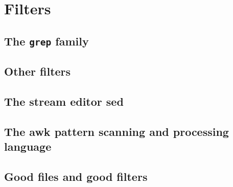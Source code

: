 \chapter{Filters}
\section{The \texttt{grep} family}
\section{Other filters}
\section{The stream editor \textbf{sed}}
\section{The \textbf{awk} pattern scanning and processing language}
\section{Good files and good filters}
